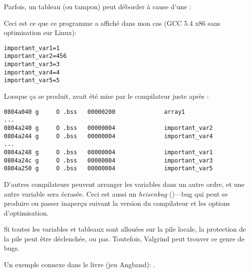 \label{GlobalArraysOverflowHeisenbug}

Parfois, un tableau (ou tampon) peut déborder à cause d'une :



Ceci est ce que ce programme a affiché dans mon cas (GCC 5.4 x86 sans optimisation sur Linux):

\begin{lstlisting}
important_var1=1
important_var2=456
important_var3=3
important_var4=4
important_var5=5
\end{lstlisting}

Lorsque ça se produit,  avait été mise par le compilateur juste
après :

\begin{lstlisting}[caption=objdump -x]
0804a040 g     O .bss   00000200              array1
...
0804a240 g     O .bss   00000004              important_var2
0804a244 g     O .bss   00000004              important_var4
...
0804a248 g     O .bss   00000004              important_var1
0804a24c g     O .bss   00000004              important_var3
0804a250 g     O .bss   00000004              important_var5
\end{lstlisting}

D'autres compilateurs peuvent arranger les variables dans un autre ordre, et une autre
variable sera écrasée.
Ceci est aussi un \textit{heisenbug} ()---bug qui peut se produire
ou passer inaperçu suivant la version du compilateur et les options d'optimisation.

Si toutes les variables et tableaux sont allouées sur la pile locale, la protection
de la pile peut être déclenchée, ou pas.
Toutefois, Valgrind peut trouver ce genre de bugs.

Un exemple connexe dans le livre (jeu Angband): .


